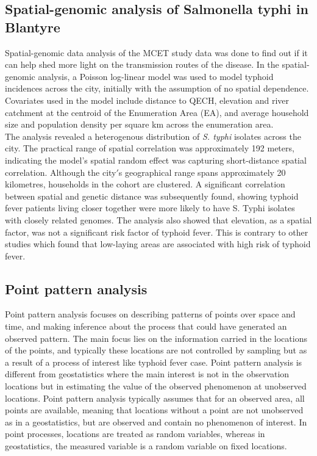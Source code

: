 \documentclass[12pt,a4paper]{report}
\begin{document}
\subsection{Spatial-genomic analysis of Salmonella typhi in Blantyre}

Spatial-genomic data analysis of the MCET study data was done to find out if it can help shed more light on the transmission routes of the disease.\cite{Gauld2019} In the spatial-genomic analysis, a Poisson log-linear model was used to model typhoid incidences across the city, initially with the assumption of no spatial dependence. Covariates used in the model include distance to QECH, elevation and river catchment at the centroid of the Enumeration Area (EA), and average household size and population density per square km across the enumeration area.\\

The analysis revealed a heterogenous distribution of \textit{S. typhi} isolates across the city.\cite{Gauld2021} The practical range of spatial correlation was approximately 192 meters, indicating the model’s spatial random effect was capturing short-distance spatial correlation. Although the city$'$s geographical range spans approximately 20 kilometres, households in the cohort are clustered. A significant correlation between spatial and genetic distance was subsequently found, showing typhoid fever patients living closer together were more likely to have S. Typhi isolates with closely related genomes. The analysis also showed that elevation, as a spatial factor, was not a significant risk factor of typhoid fever. This is contrary to other studies which found that low-laying areas are associated with high risk of typhoid fever.\cite{Akullian}

\subsection{Point pattern analysis}

Point pattern analysis focuses on describing patterns of points over space and time, and making inference about the process that could have generated an observed pattern. The main focus lies on the information carried in the locations of the points, and typically these locations are not controlled by sampling but as a result of a process of interest like typhoid fever case. Point pattern analysis is different from geostatistics where the main interest is not in the observation locations but in estimating the value of the observed phenomenon at unobserved locations. Point pattern analysis typically assumes that for an observed area, all points are available, meaning that locations without a point are not unobserved as in a geostatistics, but are observed and contain no phenomenon of interest. In point processes, locations are treated as random variables, whereas in geostatistics, the measured variable is a random variable on fixed locations.
\end{document}
